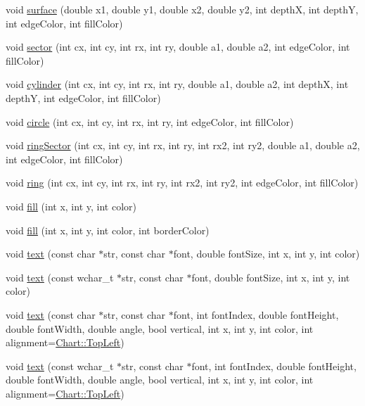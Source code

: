 \begin{DoxyCompactItemize}
\item 
void \hyperlink{class_draw_area_a459880cd624ba786e7d0bee6f6f080d0}{surface} (double x1, double y1, double x2, double y2, int depthX, int depthY, int edge\+Color, int fill\+Color)
\item 
void \hyperlink{class_draw_area_a6ba04aca84505370c0f6d35fa3ef4cb9}{sector} (int cx, int cy, int rx, int ry, double a1, double a2, int edge\+Color, int fill\+Color)
\item 
void \hyperlink{class_draw_area_a0d8b5c5958f9b5bb43b19eea323a1bdb}{cylinder} (int cx, int cy, int rx, int ry, double a1, double a2, int depthX, int depthY, int edge\+Color, int fill\+Color)
\item 
void \hyperlink{class_draw_area_af4cb297e36cbb745413a2f0043f7ceeb}{circle} (int cx, int cy, int rx, int ry, int edge\+Color, int fill\+Color)
\item 
void \hyperlink{class_draw_area_a12358fa55f0f6071857ac5231f26efa7}{ring\+Sector} (int cx, int cy, int rx, int ry, int rx2, int ry2, double a1, double a2, int edge\+Color, int fill\+Color)
\item 
void \hyperlink{class_draw_area_a53ae627b3687d63a7aa02b851cee8f4a}{ring} (int cx, int cy, int rx, int ry, int rx2, int ry2, int edge\+Color, int fill\+Color)
\item 
void \hyperlink{class_draw_area_a4d6f312431ecd2a7d790f216a711a72f}{fill} (int x, int y, int color)
\item 
void \hyperlink{class_draw_area_a5345909a5bf641aad100867bd889e837}{fill} (int x, int y, int color, int border\+Color)
\item 
void \hyperlink{class_draw_area_a6656043a957ba9eccacfccc711027d99}{text} (const char $\ast$str, const char $\ast$font, double font\+Size, int x, int y, int color)
\item 
void \hyperlink{class_draw_area_ad30bedfc7e689705a650a9e262df0749}{text} (const wchar\+\_\+t $\ast$str, const char $\ast$font, double font\+Size, int x, int y, int color)
\item 
void \hyperlink{class_draw_area_a2f38315c93227eb8ac4d1675e7ca0db7}{text} (const char $\ast$str, const char $\ast$font, int font\+Index, double font\+Height, double font\+Width, double angle, bool vertical, int x, int y, int color, int alignment=\hyperlink{namespace_chart_ae222e51ce11a254450b6ddfbc862680aa0bf92d1d2d6713aa62e92b86b9a8532f}{Chart\+::\+Top\+Left})
\item 
void \hyperlink{class_draw_area_aa73c60ff46156933aebcab3674dd3f44}{text} (const wchar\+\_\+t $\ast$str, const char $\ast$font, int font\+Index, double font\+Height, double font\+Width, double angle, bool vertical, int x, int y, int color, int alignment=\hyperlink{namespace_chart_ae222e51ce11a254450b6ddfbc862680aa0bf92d1d2d6713aa62e92b86b9a8532f}{Chart\+::\+Top\+Left})

\end{DoxyCompactItemize}
